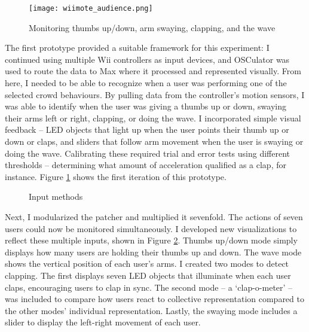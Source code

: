 \begin{figure}
	\centering

	\texttt{[image: wiimote\_audience.png]}
	\caption{Monitoring thumbs up/down, arm swaying, clapping, and the wave}

	\label{prototyping2.1}
\end{figure}

The first prototype provided a suitable framework for this experiment: I continued using multiple Wii controllers as input devices, and OSCulator was used to route the data to Max where it processed and represented visually. From here, I needed to be able to recognize when a user was performing one of the selected crowd behaviours. By pulling data from the controller's motion sensors, I was able to identify when the user was giving a thumbs up or down, swaying their arms left or right, clapping, or doing the wave. I incorporated simple visual feedback -- LED objects that light up when the user points their thumb up or down or claps, and sliders that follow arm movement when the user is swaying or doing the wave. Calibrating these required trial and error tests using different thresholds -- determining what amount of acceleration qualified as a clap, for instance. Figure \ref{prototyping2.1} shows the first iteration of this prototype.

\begin{figure}[p]		%
	\centering

	\hspace{0.1cm}
	\hspace{0.1cm}
	\hspace{0.1cm}
	\hspace{0.1cm}

	\caption{Input methods}

	\label{prototyping2.2}
\end{figure}

Next, I modularized the patcher and multiplied it sevenfold. The actions of seven users could now be monitored simultaneously. I developed new visualizations to reflect these multiple inputs, shown in Figure \ref{prototyping2.2}. Thumbs up/down mode simply displays how many users are holding their thumbs up and down. The wave mode shows the vertical position of each user's arms. I created two modes to detect clapping. The first displays seven LED objects that illuminate when each user claps, encouraging users to clap in sync. The second mode -- a `clap-o-meter' --  was included to compare how users react to collective representation compared to the other modes' individual representation.  Lastly, the swaying mode includes a slider to display the left-right movement of each user.

